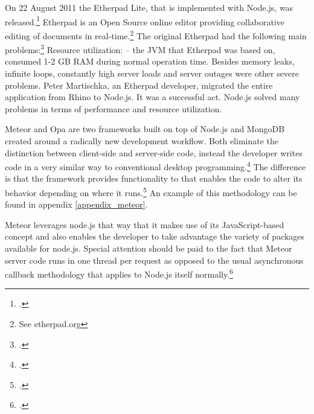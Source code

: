 \begin{appendices}
\begin{subappendices}
\label{appendix_meteor}
On 22 August 2011 the Etherpad Lite, that is implemented with Node.js, was released.\footcite[Cf.][]{Martischka_2011}  Etherpad is an Open Source online editor providing collaborative editing of documents in real-time.\footnote{See etherpad.org} The original Etherpad had the following main problems:\footcite[Cf.][]{Martischka_2011} Resource utilization: – the JVM that Etherpad was based on, consumed 1-2 GB RAM during normal operation time. Besides memory leaks, infinite loops, constantly high server loads and server outages were other severe problems.
Peter Martischka, an Etherpad developer, migrated the entire application from Rhino to Node.js. It was a successful act. Node.js solved many problems in terms of performance and resource utilization. 

Meteor and Opa are two frameworks built on top of Node.js and MongoDB created around a radically new development workflow. Both eliminate the distinction between client-side and server-side code, instead the developer writes code in a very similar way to conventional desktop programming.\footcite[Cf.][]{meteor_docs} The difference is that the framework provides functionality to that enables the code to alter its behavior depending on where it runs.\footcite[Cf.][]{meteor_docs} An example of this methodology can be found in appendix \ref{appendix_meteor}.

Meteor leverages node.js that way that it makes use of its JavaScript-based concept and also enables the developer to take advantage the variety of packages available for node.js. Special attention should be paid to the fact that Meteor server code runs in one thread per request as opposed to the usual asynchronous callback methodology that applies to Node.js itself normally.\footcite[Cf.][]{meteor_docs}


\label{app:benchmark_results}


\end{subappendices}
\end{appendices}
